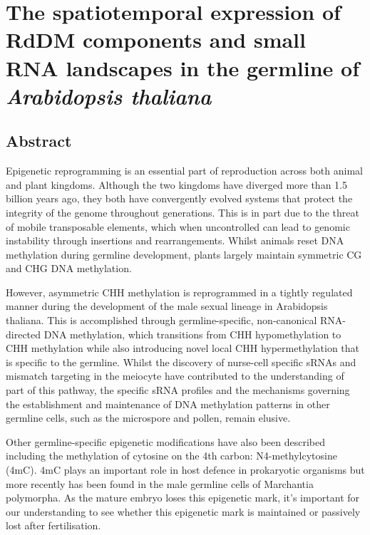 
\chapter{The spatiotemporal expression of RdDM components and small RNA landscapes in the germline of \textit{Arabidopsis thaliana}}

\ifpdf
    \graphicspath{{Chapter2/Figs/Raster/}{Chapter2/Figs/PDF/}{Chapter2/Figs/}}
\else
    \graphicspath{{Chapter2/Figs/Vector/}{Chapter2/Figs/}}
\fi


\section{Abstract}

Epigenetic reprogramming is an essential part of reproduction across both animal and plant kingdoms. Although the two kingdoms have diverged more than 1.5 billion years ago, they both have convergently evolved systems that protect the integrity of the genome throughout generations. This is in part due to the threat of mobile transposable elements, which when uncontrolled can lead to genomic instability through insertions and rearrangements. Whilst animals reset DNA methylation during germline development, plants largely maintain symmetric CG and CHG DNA methylation. 

However, asymmetric CHH methylation is reprogrammed in a tightly regulated manner during the development of the male sexual lineage in Arabidopsis thaliana. This is accomplished through germline-specific, non-canonical RNA-directed DNA methylation, which transitions from CHH hypomethylation to CHH methylation while also introducing novel local CHH hypermethylation that is specific to the germline. Whilst the discovery of nurse-cell specific sRNAs and mismatch targeting in the meiocyte have contributed to the understanding of part of this pathway, the specific sRNA profiles and the mechanisms governing the establishment and maintenance of DNA methylation patterns in other germline cells, such as the microspore and pollen, remain elusive.

Other germline-specific epigenetic modifications have also been described including the methylation of cytosine on the 4th carbon: N4-methylcytosine (4mC). 4mC plays an important role in host defence in prokaryotic organisms but more recently has been found in the male germline cells of Marchantia polymorpha. As the mature embryo loses this epigenetic mark, it’s important for our understanding to see whether this epigenetic mark is maintained or passively lost after fertilisation.


